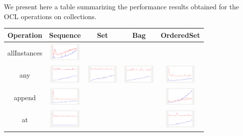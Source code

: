 We present here a table summarizing the performance results obtained for the OCL
operations on collections.

\newpage
\begin{longtable}{ c|c c c c}
  \textbf{Operation} & \textbf{Sequence} & \textbf{Set} & \textbf{Bag} & \textbf{OrderedSet} \\\hline
  allInstances & \includegraphics[width=1.6cm]{../graphs/AllInstances} & & &
  \\\hline  

any
&
\includegraphics[width=1.6cm]{../graphs/sequence/small/Any} 
&
\includegraphics[width=1.6cm]{../graphs/set/small/Any}
& 
\includegraphics[width=1.6cm]{../graphs/bag/small/Any}
& 
\includegraphics[width=1.6cm]{../graphs/orderedset/small/Any}
\\\hline
  
append
& 
\includegraphics[width=1.6cm]{../graphs/sequence/small/Append}
&
&
& 
\includegraphics[width=1.6cm]{../graphs/orderedset/small/Append}
\\\hline
  
at
& 
\includegraphics[width=1.6cm]{../graphs/sequence/small/At}
&
&
& 
\includegraphics[width=1.6cm]{../graphs/orderedset/small/At}
\\\hline


\end{longtable}
